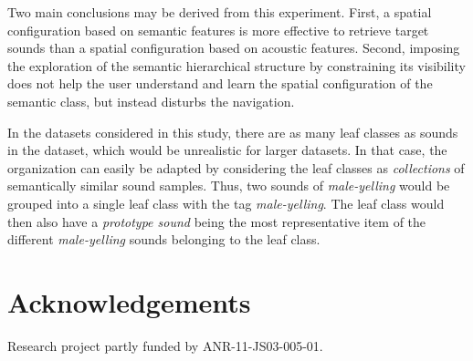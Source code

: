 \documentclass{aes2e}
\begin{document}
Two main conclusions may be derived from this experiment. First, a spatial configuration based on semantic features is more effective to retrieve target sounds than a spatial configuration based on acoustic features. Second, imposing the exploration of the semantic hierarchical structure by constraining its visibility does not help the user understand and learn the spatial configuration of the semantic class, but instead disturbs the navigation. 

In the datasets considered in this study, there are as many leaf classes as sounds in the dataset, which would be unrealistic for larger datasets. In that case, the organization can easily be adapted by considering the leaf classes as \textit{collections} of semantically similar sound samples. Thus, two sounds of \textit{male-yelling} would be grouped into a single leaf class with the tag \textit{male-yelling}. The leaf class would then also have a \textit{prototype sound} being the most representative item of the different \textit{male-yelling} sounds belonging to the leaf class.

%


\section{Acknowledgements}

Research project partly funded by ANR-11-JS03-005-01.









\end{document}
